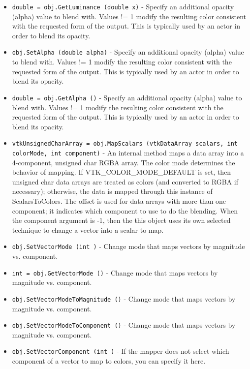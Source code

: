 \begin{itemize}
\item  \verb|double = obj.GetLuminance (double x)| -  Specify an additional opacity (alpha) value to blend with. Values
 != 1 modify the resulting color consistent with the requested
 form of the output. This is typically used by an actor in order to
 blend its opacity.

\item  \verb|obj.SetAlpha (double alpha)| -  Specify an additional opacity (alpha) value to blend with. Values
 != 1 modify the resulting color consistent with the requested
 form of the output. This is typically used by an actor in order to
 blend its opacity.

\item  \verb|double = obj.GetAlpha ()| -  Specify an additional opacity (alpha) value to blend with. Values
 != 1 modify the resulting color consistent with the requested
 form of the output. This is typically used by an actor in order to
 blend its opacity.

\item  \verb|vtkUnsignedCharArray = obj.MapScalars (vtkDataArray scalars, int colorMode, int component)| -  An internal method maps a data array into a 4-component, unsigned char
 RGBA array. The color mode determines the behavior of mapping. If 
 VTK\_COLOR\_MODE\_DEFAULT is set, then unsigned char data arrays are
 treated as colors (and converted to RGBA if necessary); otherwise, 
 the data is mapped through this instance of ScalarsToColors. The offset
 is used for data arrays with more than one component; it indicates 
 which component to use to do the blending.
 When the component argument is -1, then the this object uses its
 own selected technique to change a vector into a scalar to map.

\item  \verb|obj.SetVectorMode (int )| -  Change mode that maps vectors by magnitude vs. component.

\item  \verb|int = obj.GetVectorMode ()| -  Change mode that maps vectors by magnitude vs. component.

\item  \verb|obj.SetVectorModeToMagnitude ()| -  Change mode that maps vectors by magnitude vs. component.

\item  \verb|obj.SetVectorModeToComponent ()| -  Change mode that maps vectors by magnitude vs. component.

\item  \verb|obj.SetVectorComponent (int )| -  If the mapper does not select which component of a vector
 to map to colors, you can specify it here.


\end{itemize}
